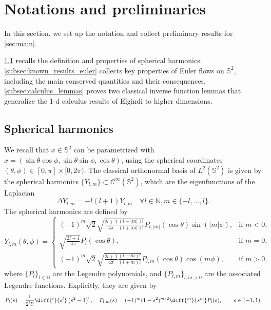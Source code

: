 \documentclass{amsart}
\def\enne{{\mathbb{N}}}
\begin{document}
\section{Notations and preliminaries} \label{sec:preliminaries}
In this section, we set up the notation and collect preliminary results for \cref{sec:main}.

\cref{subsec:spherical_harmonics} recalls the definition and properties of spherical harmonics.
\cref{subsec:known_results_euler} collects key properties of Euler flows on $\mathbb{S}^2$, including the main conserved quantities and their consequences. \cref{subsec:calculus_lemmas} proves two classical inverse function lemmas that generalize the 1-d calculus results of Elgindi \cite[Section 2.2]{elgindi2023remarkstabilityenergymaximizers} to higher dimensions.

\subsection{Spherical harmonics} \label{subsec:spherical_harmonics}
We recall that $x\in\mathbb{S}^2$ can be parametrized with $x=(\sin\theta\cos\phi,\sin\theta\sin\phi,\cos\theta)$, using the spherical coordinates $(\theta,\phi)\in[0,\pi]\times[0,2\pi)$. The classical orthonormal basis of $L^2(\mathbb{S}^2)$ is given by the spherical harmonics $\{Y_{l,m}\}\subset\mathcal{C}^\infty(\mathbb{S}^2)$, which are the eigenfunctions of the Laplacian
\begin{equation*}
    \Delta Y_{l,m}=-l(l+1)Y_{l,m}\quad\forall l\in\mathbb{N},m\in\{-l,...,l\}.
\end{equation*}
The spherical harmonics are defined by
\[
Y_{l,m}(\theta, \phi) =
\begin{cases}
(-1)^m \sqrt{2} \sqrt{\frac{2l + 1}{4\pi} \frac{(l - |m|)!}{(l + |m|)!}} P_{l,|m|}(\cos \theta) \sin(|m| \phi), & \text{if } m < 0, \\
\sqrt{\frac{2l + 1}{4\pi}} P_l(\cos \theta), & \text{if } m = 0, \\
(-1)^m \sqrt{2} \sqrt{\frac{2l + 1}{4\pi} \frac{(l - m)!}{(l + m)!}} P_{l,m}(\cos \theta) \cos(m \phi), & \text{if } m > 0,
\end{cases}
\]
where \(\{P_l\}_{l\in\enne} \) are the Legendre polynomials, and \(\{P_{l,m}\}_{l,m>0}\) are the associated Legendre functions.
Explicitly, they are given by
\[
P_l(s) = \frac{1}{2^l l!} \diff{^l}{s^l}\left( s^2 - 1 \right)^l, \quad P_{l,m}(s) = (-1)^m (1 - s^2)^{m/2} \diff{^m}{s^m}P_l(s),\qquad s \in (-1, 1).
\]
\end{document}
